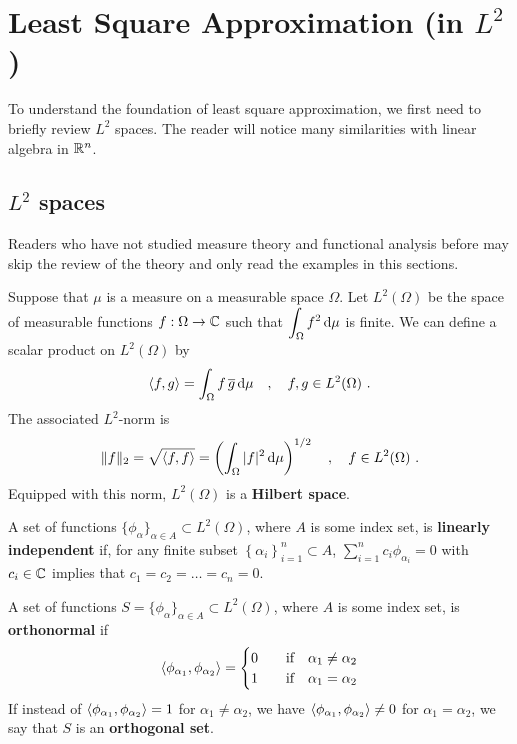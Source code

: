 \chapter{Least Square Approximation (in $L^2$)}\label{chaptApproxA}

To understand the foundation of least square approximation, we first 
need to briefly review $L^2$ spaces.  The reader will notice many
similarities with linear algebra in $\mathbb{R}^n$.

\section{$L^2$ spaces}

Readers who have not studied measure theory and functional analysis
before may skip the review of the theory and only read the examples in
this sections.

Suppose that $\mu$ is a measure on a measurable space $\Omega$.  Let
$L^2(\Omega)$ be the space of measurable functions $f:\Omega \rightarrow \mathbb{C}$
such that $\displaystyle \int_\Omega f^2 \,\mathrm{d}\mu$ is finite.  We can define
a scalar product on $L^2(\Omega)$ by
\[
\left\langle{f} , {g}\right\rangle = \int_\Omega f\, \overline{g} \,\mathrm{d}\mu \quad , \quad
f, g \in L^2(\Omega) \ .
\]
The associated $L^2$-norm is
\[
\| f \|_2 = \sqrt{\left\langle{f} , {f}\right\rangle} = \left(\int_\Omega |f|^2 \,\mathrm{d}\mu\right)^{1/2}
\quad , \quad  f \in L^2(\Omega) \ .
\]
Equipped with this norm, $L^2(\Omega)$ is a
{\bfseries Hilbert space}.

\begin{defn}
A set of functions
$\displaystyle \{ \phi_\alpha \}_{\alpha \in A} \subset L^2(\Omega)$, where
$A$ is some index set, is
{\bfseries linearly independent}
if, for any finite subset
$\displaystyle \left\{ \alpha_i \right\}_{i=1}^n \subset A$,
$\displaystyle \sum_{i=1}^n c_i \phi_{\alpha_i} = 0$ with $c_i \in \mathbb{C}$
implies that $c_1=c_2 = \ldots = c_n = 0$.
\end{defn}

\begin{defn}
A set of functions
$\displaystyle S=\{ \phi_\alpha \}_{\alpha \in A} \subset L^2(\Omega)$, where
$A$ is some index set, is
{\bfseries orthonormal} if
\[
\left\langle{\phi_{\alpha_1}} , {\phi_{\alpha_2}}\right\rangle =
\begin{cases}
0 & \quad \text{if} \quad \alpha_1 \neq \alpha_2 \\
1 & \quad \text{if} \quad \alpha_1 = \alpha_2
\end{cases}
\]
If instead of $\displaystyle \left\langle{\phi_{\alpha_1}} , {\phi_{\alpha_2}}\right\rangle = 1$ for
$\alpha_1 \neq \alpha_2$, we have
$\displaystyle \left\langle{\phi_{\alpha_1}} , {\phi_{\alpha_2}}\right\rangle \neq 0$ for
$\alpha_1 = \alpha_2$, we say that $S$ is an
{\bfseries orthogonal set}.
\end{defn}

